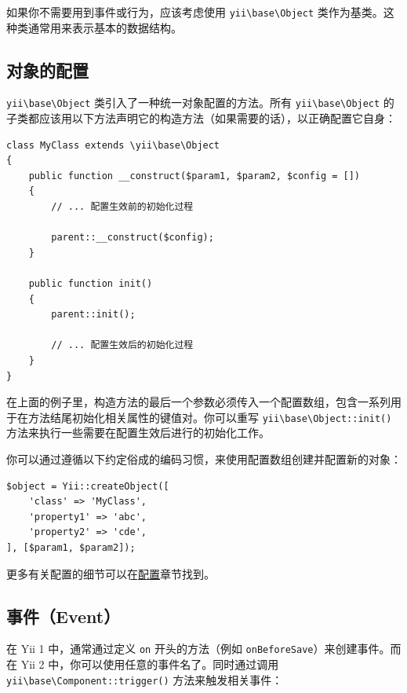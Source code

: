 如果你不需要用到事件或行为，应该考虑使用 \texttt{yii{\allowbreak{}\textbackslash}base{\allowbreak{}\textbackslash}Object} 类作为基类。这种类通常用来表示基本的数据结构。

\subsection{对象的配置}
\texttt{yii{\allowbreak{}\textbackslash}base{\allowbreak{}\textbackslash}Object} 类引入了一种统一对象配置的方法。所有 \texttt{yii{\allowbreak{}\textbackslash}base{\allowbreak{}\textbackslash}Object} 的子类都应该用以下方法声明它的构造方法（如果需要的话），以正确配置它自身：

\lstset{language=php}\begin{lstlisting}
class MyClass extends \yii\base\Object
{
    public function __construct($param1, $param2, $config = [])
    {
        // ... 配置生效前的初始化过程

        parent::__construct($config);
    }

    public function init()
    {
        parent::init();

        // ... 配置生效后的初始化过程
    }
}
\end{lstlisting}
在上面的例子里，构造方法的最后一个参数必须传入一个配置数组，包含一系列用于在方法结尾初始化相关属性的键值对。你可以重写 \texttt{yii{\allowbreak{}\textbackslash}base{\allowbreak{}\textbackslash}Object\allowbreak{}::\allowbreak{}init()} 方法来执行一些需要在配置生效后进行的初始化工作。

你可以通过遵循以下约定俗成的编码习惯，来使用配置数组创建并配置新的对象：

\lstset{language=php}\begin{lstlisting}
$object = Yii::createObject([
    'class' => 'MyClass',
    'property1' => 'abc',
    'property2' => 'cde',
], [$param1, $param2]);
\end{lstlisting}
更多有关配置的细节可以在\hyperref[concept-configurations.md]{配置}章节找到。

\subsection{事件（Event）}
在 Yii 1 中，通常通过定义 \lstinline|on| 开头的方法（例如 \lstinline|onBeforeSave|）来创建事件。而在 Yii 2 中，你可以使用任意的事件名了。同时通过调用 \texttt{yii{\allowbreak{}\textbackslash}base{\allowbreak{}\textbackslash}Component\allowbreak{}::\allowbreak{}trigger()} 方法来触发相关事件：

